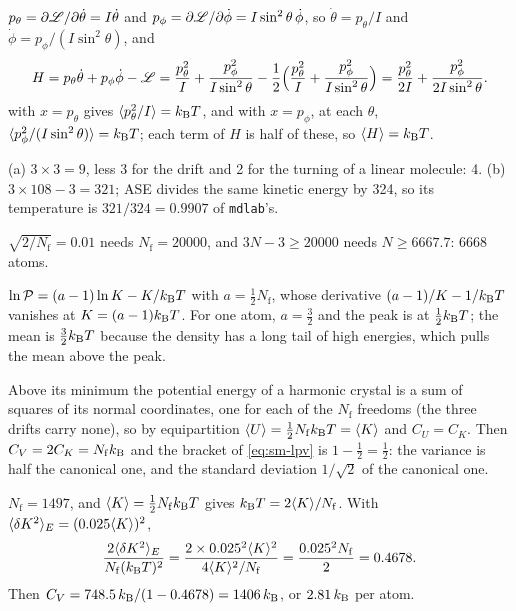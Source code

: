 $p_\theta = \partial\mathscr{L}/\partial\dot\theta =
I\dot\theta$ and $p_\phi = \partial\mathscr{L}/\partial\dot\phi =
I\sin^2\theta\,\dot\phi$, so $\dot\theta = p_\theta/I$ and $\dot\phi =
p_\phi/(I\sin^2\theta)$, and
\begin{equation*}
   H = p_\theta\dot\theta + p_\phi\dot\phi - \mathscr{L}
   = \frac{p_\theta^2}{I} + \frac{p_\phi^2}{I\sin^2\theta}
   - \frac12\Bigl(\frac{p_\theta^2}{I} + \frac{p_\phi^2}{I\sin^2\theta}
   \Bigr) = \frac{p_\theta^2}{2I} + \frac{p_\phi^2}{2I\sin^2\theta} .
\end{equation*}
 with $x = p_\theta$ gives $\langle p_\theta^2/I \rangle
= k_{\mathrm{B}} T$, and with $x = p_\phi$, at each $\theta$, $\langle p_\phi^2/(I
\sin^2\theta) \rangle = k_{\mathrm{B}} T$; each term of $H$ is half of these, so $\langle H \rangle =
k_{\mathrm{B}} T$.

(a) $3\times3 = 9$, less 3 for the drift and 2
for the turning of a linear molecule: 4. (b) $3\times108 - 3 = 321$; ASE
divides the same kinetic energy by 324, so its temperature is $321/324 =
0.9907$ of \texttt{mdlab}'s.

$\sqrt{2/N_{\mathrm f}} = 0.01$ needs
$N_{\mathrm f} = \num{20000}$, and $3N - 3 \ge \num{20000}$ needs $N \ge
6667.7$: 6668 atoms.

$\ln\mathcal{P} = (a - 1)\ln K - K/k_{\mathrm{B}} T$ with $a =
\frac12N_{\mathrm f}$, whose derivative $(a - 1)/K - 1/k_{\mathrm{B}} T$ vanishes at
$K = (a - 1)k_{\mathrm{B}} T$. For one atom, $a = \frac32$ and the peak is at
$\frac12k_{\mathrm{B}} T$; the mean is $\frac32k_{\mathrm{B}} T$ because the density has a long
tail of high energies, which pulls the mean above the peak.

Above its minimum the potential energy of a
harmonic crystal is a sum of squares of its normal coordinates, one for
each of the $N_{\mathrm f}$ freedoms (the three drifts carry none), so by
equipartition $\langle U \rangle = \frac12N_{\mathrm f}k_{\mathrm{B}} T = \langle K \rangle$ and $C_U =
C_K$. Then $C_V = 2C_K = N_{\mathrm f}k_{\mathrm{B}}$ and the bracket of
\cref{eq:sm-lpv} is $1 - \frac12 = \frac12$: the variance is half the
canonical one, and the standard deviation $1/\sqrt2$ of the canonical
one.

$N_{\mathrm f} = 1497$, and $\langle K \rangle =
\frac12N_{\mathrm f}k_{\mathrm{B}} T$ gives $k_{\mathrm{B}} T = 2\langle K \rangle/N_{\mathrm f}$. With
$\langle \delta K^2 \rangle_E = (0.025\langle K \rangle)^2$,
\begin{equation*}
   \frac{2\langle \delta K^2 \rangle_E}{N_{\mathrm f}(k_{\mathrm{B}} T)^2}
   = \frac{2\times0.025^2\langle K \rangle^2}{4\langle K \rangle^2/N_{\mathrm f}}
   = \frac{0.025^2N_{\mathrm f}}{2} = 0.4678 .
\end{equation*}
Then $C_V = 748.5\,k_{\mathrm{B}}/(1 - 0.4678) = 1406\,k_{\mathrm{B}}$, or $2.81\,k_{\mathrm{B}}$ per
atom.

